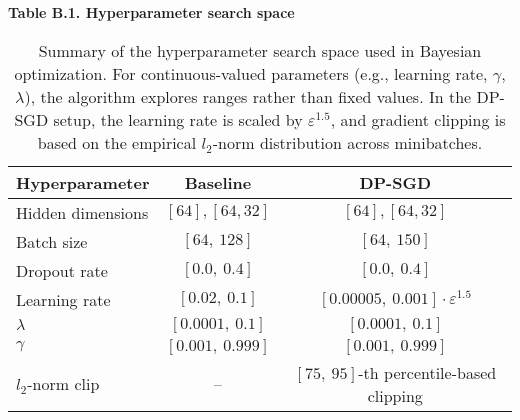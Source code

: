 \begin{table}[H]
    \centering
    \caption*{\textbf{Table B.1. Hyperparameter search space}}
    \label{tab:hyperparameter-space}
    \begin{tabular}{lcc}
    \toprule
    \textbf{Hyperparameter} & \textbf{Baseline} & \textbf{DP-SGD} \\
    \midrule
    Hidden dimensions       & \([64], [64, 32]\)                      & \([64], [64, 32]\) \\
    Batch size              & \([64,\ 128]\)                          & \([64,\ 150]\) \\
    Dropout rate            & \([0.0,\ 0.4]\)                         & \([0.0,\ 0.4]\) \\
    Learning rate           & \([0.02,\ 0.1]\)                        & \([0.00005,\ 0.001] \cdot \varepsilon^{1.5}\) \\
    \(\lambda\)             & \([0.0001,\ 0.1]\)                      & \([0.0001,\ 0.1]\) \\
    \(\gamma\)              & \([0.001,\ 0.999]\)                     & \([0.001,\ 0.999]\) \\
    \(l_2\)-norm clip       & –                                      & \([75,\ 95]\)-th percentile-based clipping \\
    \bottomrule
    \end{tabular}
    \vspace{2mm}
    \caption*{\footnotesize Summary of the hyperparameter search space used in Bayesian optimization. For continuous-valued parameters (e.g., learning rate, \(\gamma\), \(\lambda\)), the algorithm explores ranges rather than fixed values. In the DP-SGD setup, the learning rate is scaled by \(\varepsilon^{1.5}\), and gradient clipping is based on the empirical \(l_2\)-norm distribution across minibatches.}
\end{table}